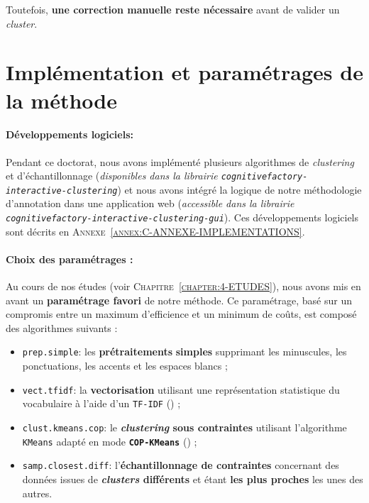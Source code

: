 			Toutefois, \textbf{une correction manuelle reste nécessaire} avant de valider un \textit{cluster}.
	
	
	\newpage
	\section{Implémentation et paramétrages de la méthode}
		\label{section:5.4-GUIDE-PARAMETRAGES}
		
		\paragraph{\textcolor{colorSilverLakeBlue}{\faCheckSquare} Développements logiciels:}
		
			Pendant ce doctorat, nous avons implémenté plusieurs algorithmes de \textit{clustering} et d'échantillonnage (\textit{disponibles dans la librairie \texttt{cognitivefactory-interactive-clustering}}) et nous avons intégré la logique de notre méthodologie d'annotation dans une application web (\textit{accessible dans la librairie \texttt{cognitivefactory-interactive-clustering-gui}}).
			Ces développements logiciels sont décrits en \textsc{Annexe~\ref{annex:C-ANNEXE-IMPLEMENTATIONS}}.
		
		\paragraph{\textcolor{colorSilverLakeBlue}{\faCheckSquare} Choix des paramétrages :}
		
			Au cours de nos études (voir \textsc{Chapitre~\ref{chapter:4-ETUDES}}), nous avons mis en avant un \textbf{paramétrage favori} de notre méthode.
			Ce paramétrage, basé sur un compromis entre un maximum d'efficience et un minimum de coûts, est composé des algorithmes suivants :
			
			\begin{itemize}
				\item \texttt{prep.simple}: les \textbf{prétraitements} \textbf{simples} supprimant les minuscules, les ponctuations, les accents et les espaces blancs ;
				\item \texttt{vect.tfidf}: la \textbf{vectorisation} utilisant une représentation statistique du vocabulaire à l'aide d'un \texttt{TF-IDF} (\cite{ramos:2003:using-tfidf-determine}) ;
				\item \texttt{clust.kmeans.cop}: le \textbf{\textit{clustering} sous contraintes} utilisant l'algorithme \texttt{KMeans} adapté en mode \textbf{\texttt{COP-KMeans}} (\cite{wagstaff-etal:2001:constrained-kmeans-clustering}) ;
				\item \texttt{samp.closest.diff}: l'\textbf{échantillonnage de contraintes} concernant des données issues de \textbf{\textit{clusters} différents} et étant \textbf{les plus proches} les unes des autres.
			\end{itemize}
		
